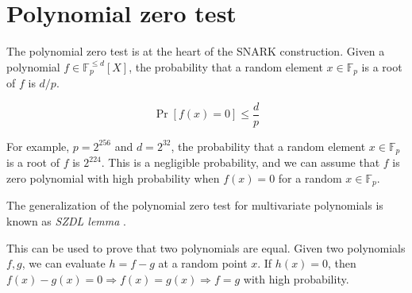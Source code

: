 \setcounter{figure}{0}
\setcounter{listing}{0}

\chapter{Polynomial zero test}
\label{appendix:zero_test}
\renewcommand*{\thepage}{A-\arabic{page}}

\begin{refsegment}

    The polynomial zero test is at the heart of the SNARK construction. Given a
    polynomial $f \in \mathbb{F}_p^{\leq d}[X]$, the probability that a random
    element $x \in \mathbb{F}_p$ is a root of $f$ is $d/p$.

    \[ \Pr[f(x) = 0] \leq \frac{d}{p} \]

    For example, $p = 2^{256}$ and $d = 2^{32}$, the probability that a random
    element $x \in \mathbb{F}_p$ is a root of $f$ is $2^{224}$. This is a negligible
    probability, and we can assume that $f$ is zero polynomial with high
    probability when $f(x) = 0$ for a random $x \in \mathbb{F}_p$.

    The generalization of the polynomial zero test for multivariate polynomials is
    known as \textit{SZDL lemma} \cite{Schwartz1980,Zippel1979,Demillo1978}.

    This can be used to prove that two polynomials are equal. Given two polynomials
    $f, g$, we can evaluate $h = f - g$ at a random point $x$. If $h(x) = 0$, then
    $f(x) - g(x) = 0 \Longrightarrow f(x) = g(x) \Longrightarrow f = g$ with high probability.

    \printbibliography[heading=referencessec,segment=\therefsegment,resetnumbers=true]

\end{refsegment}
